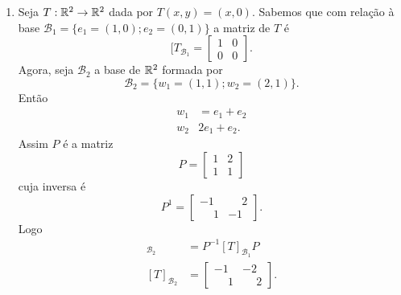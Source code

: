 \begin{exemplos}
	\begin{enumerate}
		\item Seja $T : \mathbb{R}^2 \to \mathbb{R}^2$ dada por $T(x,y) = (x,0)$. Sabemos que com rela\c{c}\~ao \`a base $\mathcal{B}_1 = \{e_1=(1,0);e_2=(0,1)\}$ a matriz de $T$ \'e
		\[
			[T_{\mathcal{B}_1} = \begin{bmatrix}
				1 & 0\\
				0 & 0
			\end{bmatrix}.
		\]
		Agora, seja $\mathcal{B}_2$ a base de $\mathbb{R}^2$ formada por
		\[
			\mathcal{B}_2 = \{w_1 = (1,1);w_2=(2,1)\}.
		\]
		Ent\~ao
		\begin{align*}
			w_1 &= e_1 + e_2\\
			w_2 & 2e_1 + e_2.
		\end{align*}
		Assim $P$ \'e a matriz
		\[
			P = \begin{bmatrix}
				1 & 2\\
				1 & 1
			\end{bmatrix}
		\]
		cuja inversa \'e
		\[
			P^1 = \begin{bmatrix}
				-1 & \phantom{-}2\\
				\phantom{-}1 & -1
			\end{bmatrix}.
		\]
		Logo
		\begin{align*}
			[T]_{\mathcal{B}_2} &= P^{-1}[T]_{\mathcal{B}_1}P\\
			[T]_{\mathcal{B}_2} &= \begin{bmatrix}
				-1 & -2\\
				\phantom{-}1 & \phantom{-}2
			\end{bmatrix}.
		\end{align*}


\end{enumerate}
\end{exemplos}

